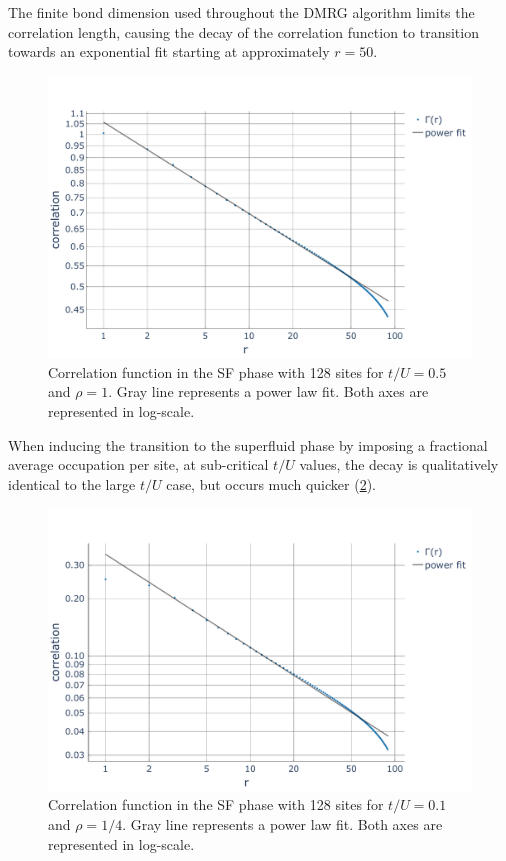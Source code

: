 \documentclass[twoside,twocolumn,9pt]{article}
\begin{document}
The finite bond dimension used throughout the DMRG algorithm limits the correlation length, causing the decay of the correlation function to transition towards an exponential fit starting at approximately $r=50$.
\begin{center}
  \begin{figure}
      \includegraphics[width=\linewidth]{../code/figures/Correlations-SF1.pdf}
      \caption{Correlation function in the SF phase with 128 sites for $t/U=0.5$ and $\rho=1$. Gray line represents a power law fit. Both axes are represented in log-scale.}
      \label{fig:corSF1}
  \end{figure}
\end{center}
When inducing the transition to the superfluid phase by imposing a fractional average occupation per site, at sub-critical $t/U$ values, the decay is qualitatively identical to the large $t/U$ case, but occurs much quicker (\cref{fig:corSF2}).
\begin{center}
  \begin{figure}
      \includegraphics[width=\linewidth]{../code/figures/Correlations-SF2.pdf}
      \caption{Correlation function in the SF phase with 128 sites for $t/U=0.1$ and $\rho=1/4$. Gray line represents a power law fit. Both axes are represented in log-scale.}
      \label{fig:corSF2}
  \end{figure}
\end{center}
 
\end{document}
